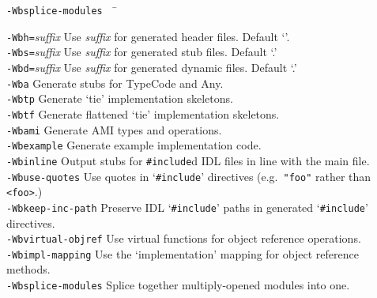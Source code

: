 \documentclass[11pt,oneside,a4paper]{book}
\newcommand{\code}[1]{\texttt{#1}}
\newcommand{\cmdline}[1]{\texttt{#1}}
\begin{document}
\begin{tabbing}
\cmdline{-Wbsplice-modules}~~ \= \kill

\cmdline{-Wbh=}\textit{suffix}
     \> Use \textit{suffix} for generated header files. Default
        `'.\\

\cmdline{-Wbs=}\textit{suffix}
     \> Use \textit{suffix} for generated stub files. Default
        `.'\\

\cmdline{-Wbd=}\textit{suffix}
     \> Use \textit{suffix} for generated dynamic files. Default
        `.'\\

\cmdline{-Wba}
     \> Generate stubs for TypeCode and Any.\\

\cmdline{-Wbtp}
     \> Generate `tie' implementation skeletons.\\

\cmdline{-Wbtf}
     \> Generate flattened `tie' implementation skeletons.\\

\cmdline{-Wbami}
     \> Generate AMI types and operations.\\

\cmdline{-Wbexample}
     \> Generate example implementation code.\\

\cmdline{-Wbinline}
     \> Output stubs for \code{\#include}d IDL files in line with the
        main file.\\

\cmdline{-Wbuse-quotes}
     \> Use quotes in `\code{\#include}' directives 
        (e.g.\ \code{"foo"} rather than \code{<foo>}.)\\

\cmdline{-Wbkeep-inc-path}
     \> Preserve IDL `\code{\#include}' paths in generated
       	`\code{\#include}' directives.\\

\cmdline{-Wbvirtual-objref}
     \> Use virtual functions for object reference operations.\\

\cmdline{-Wbimpl-mapping}
     \> Use the `implementation' mapping for object reference methods.\\

\cmdline{-Wbsplice-modules}
     \> Splice together multiply-opened modules into one.\\


\end{tabbing}
\end{document}

